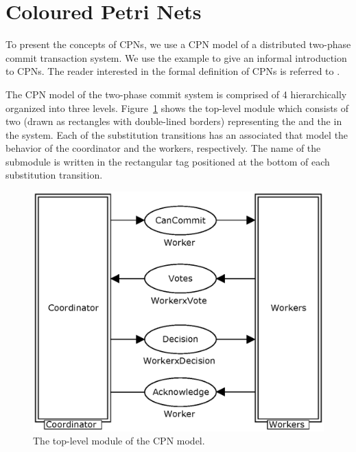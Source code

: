 \section{Coloured Petri Nets}

To present the concepts of CPNs, we use a CPN model of a distributed
two-phase commit transaction system. We use the example to give an
informal introduction to CPNs. The reader interested in the formal
definition of CPNs is referred to \cite{X}.


The CPN model of the two-phase commit system is comprised of 4
 hierarchically organized into three
levels. Figure~\ref{fig:commit} shows the top-level module which
consists of two  (drawn as
rectangles with double-lined borders) representing the
 and the  in the system. Each of
the substitution transitions has an associated  that
model the behavior of the coordinator and the workers,
respectively. The name of the submodule is written in the rectangular
tag positioned at the bottom of each substitution transition.

\begin{figure}[b]
\centering
\includegraphics[scale=.52]{figures/Commit.eps}
\caption{The top-level module of the CPN model.}
\label{fig:commit}
\end{figure}


